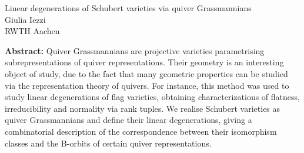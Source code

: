 \documentclass[12pt,a4paper]{article}
\begin{document}
\thispagestyle{empty} 
\begin{center}
{\large Linear degenerations of Schubert varieties via quiver Grassmannians}\\
\vspace*{.5cm}
Giulia Iezzi\\
RWTH Aachen\\
\end{center}
\vspace*{.8cm}

{\bf Abstract:} Quiver Grassmannians are projective varieties  parametrising subrepresentations of quiver representations. Their geometry is an interesting object of study, due to the fact that many geometric properties can be studied via the representation theory of quivers. For instance, this method was used to study linear degenerations of flag varieties, obtaining characterizations of flatness, irreducibility and normality via rank tuples. We realise Schubert varieties as quiver Grassmannians and define their linear degenerations, giving a combinatorial description of the correspondence between their isomorphism classes and the B-orbits of certain quiver representations. 
\end{document}
